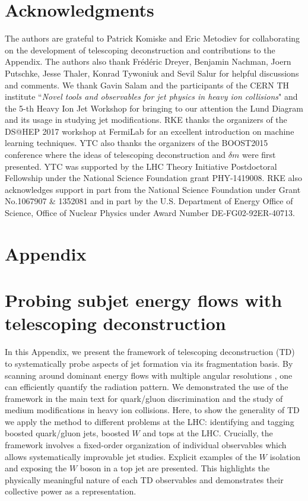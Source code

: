 \documentclass[notoc,preprintnumbers]{JHEP3}
\begin{document}
\section*{Acknowledgments}
The authors are grateful to Patrick Komiske and Eric Metodiev for collaborating on the development of telescoping deconstruction and contributions to the Appendix. The authors also thank Fr\'ed\'eric Dreyer, Benjamin Nachman, Joern Putschke, Jesse Thaler, Konrad Tywoniuk and Sevil Salur for helpful discussions and comments. We thank Gavin Salam and the participants of the CERN TH institute ``{\sl Novel tools and observables for jet physics in heavy ion collisions}" and the 5-th Heavy Ion Jet Workshop for bringing to our attention the Lund Diagram and its usage in studying jet modifications. RKE thanks the organizers of the DS@HEP 2017 workshop at FermiLab for an excellent introduction on machine learning techniques. YTC also thanks the organizers of the BOOST2015 conference where the ideas of telescoping deconstruction and $\delta m$ were first presented. YTC was supported by the LHC Theory Initiative Postdoctoral Fellowship under the National Science Foundation grant PHY-1419008. RKE also acknowledges support in part from the National Science Foundation under Grant No.1067907 \& 1352081 and in part by the U.S. Department of Energy Office of Science, Office of Nuclear Physics under Award Number DE-FG02-92ER-40713.









\newpage
\appendix
\section*{Appendix}
\section{Probing subjet energy flows with telescoping deconstruction}

In this Appendix, we present the framework of telescoping deconstruction (TD) to systematically probe aspects of jet formation via its fragmentation basis. By scanning around dominant energy flows with multiple angular resolutions \cite{Chien:2013kca,Chien:2014hla}, one can efficiently quantify the radiation pattern. We demonstrated the use of the framework in the main text for quark/gluon discrimination and the study of medium modifications in heavy ion collisions. Here, to show the generality of TD we apply the method to different problems at the LHC: identifying and tagging boosted quark/gluon jets,  boosted $W$ and tops at the LHC. Crucially, the framework involves a fixed-order organization of individual observables which allows systematically improvable jet studies. Explicit examples of the $W$ isolation \cite{Chien:2017xrb} and exposing the $W$ boson in a top jet are presented. This highlights the physically meaningful nature of each TD observables and demonstrates their collective power as a representation.
\end{document}
